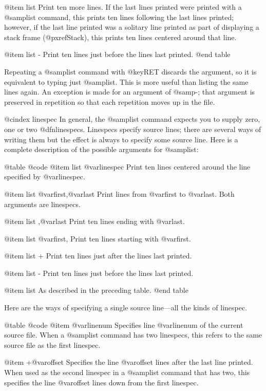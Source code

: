 @item list
Print ten more lines.  If the last lines printed were printed with a
@samp{list} command, this prints ten lines following the last lines
printed; however, if the last line printed was a solitary line printed
as part of displaying a stack frame (@pxref{Stack}), this prints ten
lines centered around that line.

@item list -
Print ten lines just before the lines last printed.
@end table

Repeating a @samp{list} command with @key{RET} discards the argument,
so it is equivalent to typing just @samp{list}.  This is more useful
than listing the same lines again.  An exception is made for an
argument of @samp{-}; that argument is preserved in repetition so that
each repetition moves up in the file.

@cindex linespec
In general, the @samp{list} command expects you to supply zero, one or two
@dfn{linespecs}.  Linespecs specify source lines; there are several ways
of writing them but the effect is always to specify some source line.
Here is a complete description of the possible arguments for @samp{list}:

@table @code
@item list @var{linespec}
Print ten lines centered around the line specified by @var{linespec}.

@item list @var{first},@var{last}
Print lines from @var{first} to @var{last}.  Both arguments are
linespecs.

@item list ,@var{last}
Print ten lines ending with @var{last}.

@item list @var{first},
Print ten lines starting with @var{first}.

@item list +
Print ten lines just after the lines last printed.

@item list -
Print ten lines just before the lines last printed.

@item list
As described in the preceding table.
@end table

Here are the ways of specifying a single source line---all the
kinds of linespec.

@table @code
@item @var{linenum}
Specifies line @var{linenum} of the current source file.
When a @samp{list} command has two linespecs, this refers to
the same source file as the first linespec.

@item +@var{offset}
Specifies the line @var{offset} lines after the last line printed.
When used as the second linespec in a @samp{list} command that has
two, this specifies the line @var{offset} lines down from the
first linespec.

